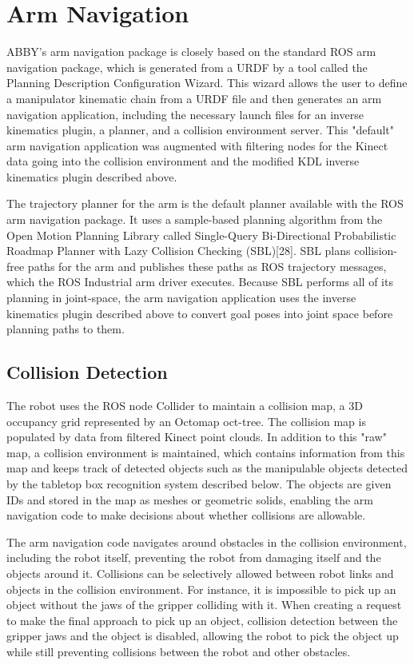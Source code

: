 \documentclass[]{cwru} %
\begin{document}
\section{Arm Navigation}
\label{arm-nav}

ABBY's arm navigation package is closely based on the standard ROS arm
navigation package, which is generated from a URDF by a tool called the
Planning Description Configuration Wizard. This wizard allows the user
to define a manipulator kinematic chain from a URDF file and then
generates an arm navigation application, including the necessary launch
files for an inverse kinematics plugin, a planner, and a collision
environment server. This "default" arm navigation application was
augmented with filtering nodes for the Kinect data going into the
collision environment and the modified KDL inverse kinematics plugin
described above.

The trajectory planner for the arm is the default planner available with
the ROS arm navigation package. It uses a sample-based planning
algorithm from the Open Motion Planning Library called Single-Query
Bi-Directional Probabilistic Roadmap Planner with Lazy Collision
Checking (SBL){[}28{]}. SBL plans collision-free paths for the arm and
publishes these paths as ROS trajectory messages, which the ROS
Industrial arm driver executes. Because SBL performs all of its planning
in joint-space, the arm navigation application uses the inverse
kinematics plugin described above to convert goal poses into joint space
before planning paths to them.

\subsection{Collision Detection}

The robot uses the ROS node Collider to maintain a collision map, a 3D
occupancy grid represented by an Octomap oct-tree. The collision map is
populated by data from filtered Kinect point clouds. In addition to this
"raw" map, a collision environment is maintained, which contains
information from this map and keeps track of detected objects such as
the manipulable objects detected by the tabletop box recognition system
described below. The objects are given IDs and stored in the map as
meshes or geometric solids, enabling the arm navigation code to make
decisions about whether collisions are allowable.

The arm navigation code navigates around obstacles in the collision
environment, including the robot itself, preventing the robot from
damaging itself and the objects around it. Collisions can be selectively
allowed between robot links and objects in the collision environment.
For instance, it is impossible to pick up an object without the jaws of
the gripper colliding with it. When creating a request to make the final
approach to pick up an object, collision detection between the gripper
jaws and the object is disabled, allowing the robot to pick the object
up while still preventing collisions between the robot and other
obstacles.
\end{document}
